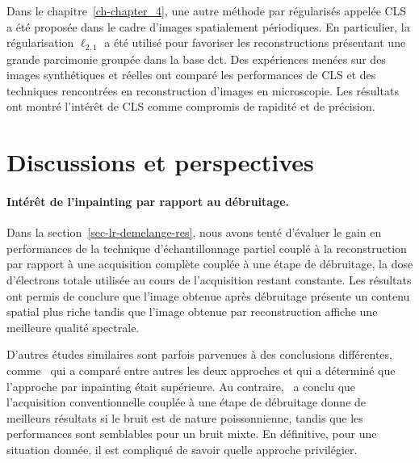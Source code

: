 Dans le chapitre~\ref{ch-chapter_4}, une autre méthode par  régularisés appelée CLS a été proposée dans le cadre d'images spatialement périodiques. En particulier, la régularisation $\ell_{2,1}$ a été utilisé pour favoriser les reconstructions présentant une grande parcimonie groupée dans la base \gls{dct}. Des expériences menées sur des images synthétiques et réelles ont comparé les performances de CLS et des techniques rencontrées en reconstruction d'images en microscopie. Les résultats ont montré l'intérêt de CLS comme compromis de rapidité et de précision.


\section*{Discussions et perspectives}

\paragraph{Intérêt de l'inpainting par rapport au débruitage.} Dans la section~\ref{sec-lr-demelange-res}, nous avons tenté d'évaluer le gain en performances de la technique d'échantillonnage partiel couplé à la reconstruction par rapport à une acquisition complète couplée à une étape de débruitage, la dose d'électrons totale utilisée au cours de l'acquisition restant constante. Les résultats ont permis de conclure que l'image obtenue après débruitage présente un contenu spatial plus riche tandis que l'image obtenue par reconstruction affiche une meilleure qualité spectrale.

D'autres études similaires sont parfois parvenues à des conclusions différentes, comme~\cite{trampert2018ultramicroscopy} qui a comparé entre autres les deux approches et qui a déterminé que l'approche par inpainting était supérieure. Au contraire,~\cite{sanders2020inpainting} a conclu que l'acquisition conventionnelle couplée à une étape de débruitage donne de meilleurs résultats si le bruit est de nature poissonnienne, tandis que les performances sont semblables pour un bruit mixte. En définitive, pour une situation donnée, il est compliqué de savoir quelle approche privilégier.

